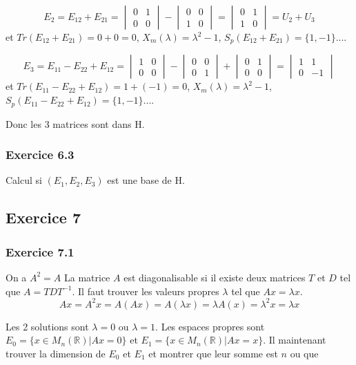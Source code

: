 \documentclass[]{book}
\theoremstyle{definition}
\newcommand{\bb}[1]{\mathbb{#1}}
\newcommand{\R}{\bb{R}}
\begin{document}
$$
E_2 = E_{12}+E_{21} = \begin{vmatrix} 0 & 1 \\ 0 & 0 \end{vmatrix} - \begin{vmatrix} 0 & 0 \\ 1 & 0 \end{vmatrix} =  \begin{vmatrix} 0 & 1 \\ 1 & 0 \end{vmatrix} = U_2 + U_3
$$
et $Tr(E_{12}+E_{21}) = 0 + 0 = 0$, $X_m(\lambda) = \lambda^2-1$, $S_p(E_{12}+E_{21}) = \{1, -1\}$.... 

$$
E_3 = E_{11}-E_{22}+E_{12} = \begin{vmatrix} 1 & 0 \\ 0 & 0 \end{vmatrix} - \begin{vmatrix} 0 & 0 \\ 0 & 1 \end{vmatrix} + \begin{vmatrix} 0 & 1 \\ 0 & 0 \end{vmatrix} =  \begin{vmatrix} 1 & 1 \\ 0 & -1 \end{vmatrix} 
$$
et $Tr(E_{11}-E_{22}+E_{12}) = 1 + (-1) = 0$, $X_m(\lambda) = \lambda^2-1$, $S_p(E_{11}-E_{22}+E_{12}) = \{1, -1\}$.... 

Donc les 3 matrices sont dans H.

\subsubsection*{Exercice 6.3}
Calcul si $(E_1, E_2, E_3)$ est une base de H. 

\subsection*{Exercice 7}
\subsubsection*{Exercice 7.1}
On a $A^2 = A$ La matrice $A$ est diagonalisable si il existe deux matrices $T$ et $D$ tel que $A=TDT^{-1}$. Il faut trouver les valeurs propres $\lambda$ tel que $Ax = \lambda x$.
$$
Ax = A^2x = A(Ax) = A(\lambda x) = \lambda A(x) = \lambda^2 x = \lambda x
$$

Les 2 solutions sont $\lambda = 0$ ou $\lambda = 1$. Les espaces propres sont $E_0 = \{x \in M_n(\R)|Ax = 0\}$ et $E_1 = \{x \in M_n(\R)|Ax = x\}$. Il maintenant trouver la dimension de $E_0$ et $E_1$ et montrer que leur somme est $n$ ou que 
\end{document}
